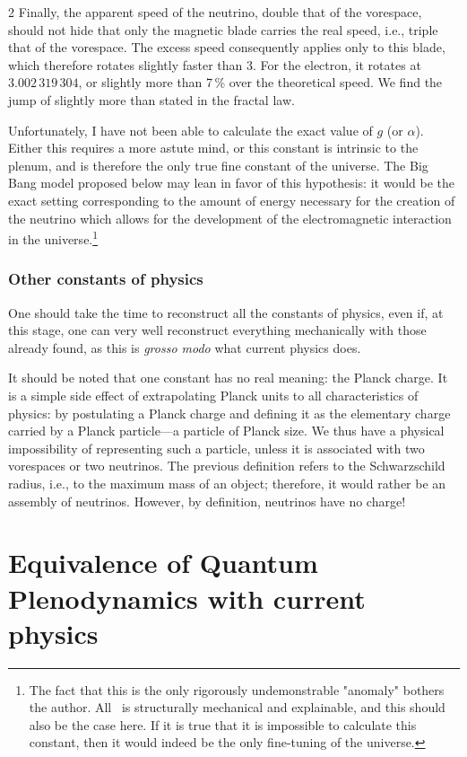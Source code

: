 \begin{multicols}{2}
	Finally, the apparent speed of the neutrino, double that of the vorespace, should not hide that only the magnetic blade carries the real speed, i.e., triple that of the vorespace. The excess speed consequently applies only to this blade, which therefore rotates slightly faster than 3. For the electron, it rotates at $3.002\,319\,304$, or slightly more than 7\,\% over the theoretical speed. We find the jump of slightly more than  stated in the fractal law.
	\medskip
	
	Unfortunately, I have not been able to calculate the exact value of $g$ (or $\alpha$). Either this requires a more astute mind, or this constant is intrinsic to the plenum, and is therefore the only true fine constant of the universe. The Big Bang model proposed below may lean in favor of this hypothesis: it would be the exact setting corresponding to the amount of energy necessary for the creation of the neutrino which allows for the development of the electromagnetic interaction in the universe.\footnote{The fact that this is the only rigorously undemonstrable "anomaly" bothers the author. All \PQ\ is structurally mechanical and explainable, and this should also be the case here. If it is true that it is impossible to calculate this constant, then it would indeed be the only fine-tuning of the universe.}
	
	\subsubsection{Other constants of physics}
	
	One should take the time to reconstruct all the constants of physics, even if, at this stage, one can very well reconstruct everything mechanically with those already found, as this is \textit{grosso modo} what current physics does.
	
	It should be noted that one constant has no real meaning: the Planck charge. It is a simple side effect of extrapolating Planck units to all characteristics of physics: by postulating a Planck charge and defining it as the elementary charge carried by a Planck particle—a particle of Planck size. We thus have a physical impossibility of representing such a particle, unless it is associated with two vorespaces or two neutrinos. The previous definition refers to the Schwarzschild radius, i.e., to the maximum mass of an object; therefore, it would rather be an assembly of neutrinos. However, by definition, neutrinos have no charge!
	
	\section{Equivalence of Quantum Plenodynamics with current physics}
	

\end{multicols}
